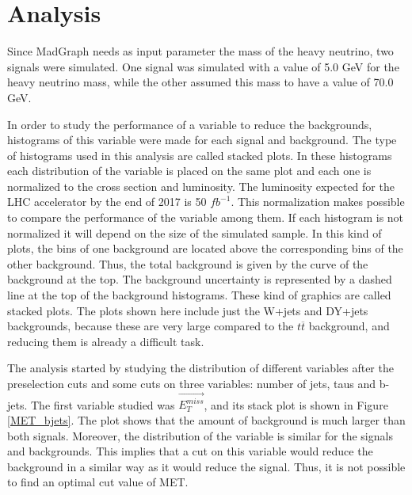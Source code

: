 \chapter{Analysis}
\label{Analysis_chapter}

Since MadGraph needs as input parameter the mass of the heavy neutrino, two signals were simulated. One signal was simulated with a value of 5.0 GeV for the heavy neutrino mass, while the other assumed 
this mass to have a value of 70.0 GeV. 

In order to study the performance of a variable to reduce the backgrounds, histograms of this variable were made for each signal and background. The type of histograms used in this analysis are called stacked plots. In these histograms each distribution of the variable is placed on the same plot and each one is normalized to the cross section and luminosity. The luminosity expected for the LHC accelerator by the end of 2017 is 50 $fb^{-1}$. This normalization makes possible to compare the performance of the variable among them.  If each histogram is not normalized it will depend on the size of the simulated sample. In this kind of plots, the bins of one background are located above the corresponding bins of the other background. Thus, the total background is given by the curve of the background at the top. The background uncertainty is represented by a dashed line at the top of the background histograms. These kind of graphics are called stacked plots. The plots shown here include just the W+jets and DY+jets backgrounds, because these are very large compared to the $t\overline{t}$ background, and reducing them is already a difficult task.

The analysis started by studying the distribution of different variables after the preselection cuts and some cuts on three variables: number of jets, taus and b-jets. The first variable studied 
was $\vec{E_T^{miss}}$, and its stack plot is shown in Figure \ref{MET_bjets}. The plot shows that the amount of background is much larger than both signals. Moreover, the distribution of the 
variable is similar for the signals and backgrounds. This implies that a cut on this variable would reduce the background in a similar way as it would reduce the signal. Thus, it is not possible 
to find an optimal cut value of MET.

